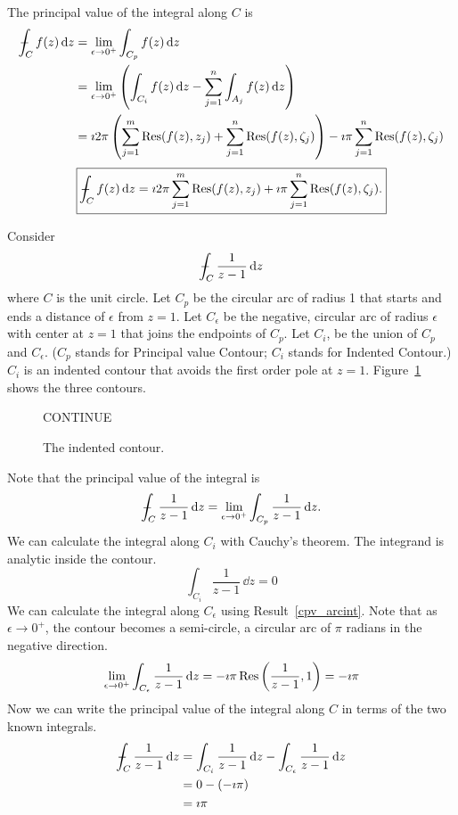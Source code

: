 {\begin{Solution}
  The principal value of the integral along $C$ is
  \begin{align*}
    - \negthickspace \negthickspace \negthickspace \negmedspace \int_C f(z) \,\mathrm{d} z
    &= \lim_{\epsilon \to 0^+} \int_{C_p} f(z) \,\mathrm{d} z \\
    &= \lim_{\epsilon \to 0^+} \left( \int_{C_i} f(z) \,\mathrm{d} z -
      \sum_{j=1}^n \int_{A_j} f(z) \,\mathrm{d} z \right) \\
    &= \imath 2 \pi \left( \sum_{j=1}^m \mathop{\mathrm{Res}}\nolimits(f(z),z_j)
      + \sum_{j=1}^n \mathop{\mathrm{Res}}\nolimits(f(z),\zeta_j) \right) -
    \imath \pi \sum_{j=1}^n \mathop{\mathrm{Res}}\nolimits(f(z),\zeta_j) 
  \end{align*}
  \[
  \boxed{
    - \negthickspace \negthickspace \negthickspace \negmedspace \int_C f(z) \,\mathrm{d} z = \imath 2 \pi \sum_{j=1}^m \mathop{\mathrm{Res}}\nolimits(f(z),z_j)
    + \imath \pi \sum_{j=1}^n \mathop{\mathrm{Res}}\nolimits(f(z),\zeta_j).
    }
  \]
\end{Solution}



\begin{Solution}
  \label{solution 1/(z-1)}
  Consider 
  \[
  - \negthickspace \negthickspace \negthickspace \negmedspace \int_C \frac{1}{z-1} \,\mathrm{d} z
  \]
  where $C$ is the unit circle.
  Let $C_p$ be the circular arc of radius 1 that starts and ends a distance
  of $\epsilon$ from $z=1$.  Let $C_\epsilon$ be the negative,
  circular arc of radius $\epsilon$ with center at $z=1$ that joins the endpoints
  of $C_p$.  Let $C_i$, be the union of $C_p$ and $C_\epsilon$.  ($C_p$ stands
  for Principal value Contour; $C_i$ stands for Indented Contour.)  $C_i$ is
  an indented contour that avoids the first order pole at $z=1$.  
  Figure~\ref{cpv_cicpceneg} shows the three contours.

  \begin{figure}[tb!]
    \begin{center}
      CONTINUE
      \caption{The indented contour.}
      \label{cpv_cicpceneg}
    \end{center}
  \end{figure}

  Note that the principal value of the integral is
  \[
  - \negthickspace \negthickspace \negthickspace \negmedspace \int_C \frac{1}{z-1} \,\mathrm{d} z
  = \lim_{\epsilon \to 0^+} \int_{C_p} \frac{1}{z-1} \,\mathrm{d} z.
  \]
  We can calculate the integral along $C_i$ with Cauchy's theorem.  The 
  integrand is analytic inside the contour.
  \[
  \int_{C_i} \frac{1}{z-1} \,\dd z = 0
  \]
  We can calculate the integral along $C_\epsilon$ using Result~\ref{cpv_arcint}.
  Note that as $\epsilon \to 0^+$, the contour becomes a semi-circle, a 
  circular arc of $\pi$ radians in the negative direction.
  \[
  \lim_{\epsilon \to 0^+} \int_{C_\epsilon} \frac{1}{z-1} \,\mathrm{d} z
  = - \imath \pi \mathop{\mathrm{Res}}\nolimits\left( \frac{1}{z-1}, 1 \right) = - \imath \pi
  \]
  Now we can write the principal value of the integral along $C$ in terms of
  the two known integrals.
  \begin{align*}
    - \negthickspace \negthickspace \negthickspace \negmedspace \int_C \frac{1}{z-1} \,\mathrm{d} z 
    &= \int_{C_i} \frac{1}{z-1} \,\mathrm{d} z
    - \int_{C_\epsilon} \frac{1}{z-1} \,\mathrm{d} z \\
    &= 0 - (-\imath \pi) \\
    &= \imath \pi
  \end{align*}
\end{Solution}




}
